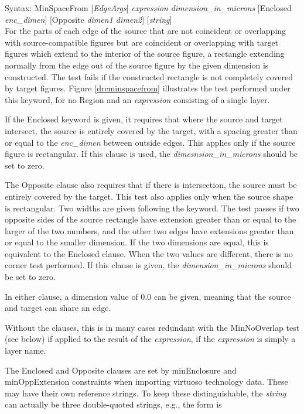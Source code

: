 \begin{description}
\item{Syntax: {\vt MinSpaceFrom} [{\it EdgeArgs\/}]
    {\it expression dimension\_in\_microns}
    [{\vt Enclosed} {\it enc\_dimen\/}]
    [{\vt Opposite} {\it dimen1 dimen2\/}] [{\it string\/}] }\\

For the parts of each edge of the source that are not coincident or
overlapping with source-compatible figures but are coincident or
overlapping with target figures which extend to the interior of the
source figure, a rectangle extending normally from the edge out of the
source figure by the given dimension is constructed.  The test fails
if the constructed rectangle is not completely covered by target
figures.  Figure \ref{drcminspacefrom} illustrates the test performed
under this keyword, for no {\et Region} and an {\it expression}
consisting of a single layer. 

If the {\vt Enclosed} keyword is given, it requires that where the
source and target intersect, the source is entirely covered by the
target, with a spacing greater than or equal to the {\it enc\_dimen}
between outside edges.  This applies only if the source figure is
rectangular.  If this clause is used, the {\it
dimesnsion\_in\_microns} should be set to zero.

The {\vt Opposite} clause also requires that if there is intersection,
the source must be entirely covered by the target.  This test also
applies only when the source shape is rectangular.  Two widths are
given following the keyword.  The test passes if two opposite sides of
the source rectangle have extension greater than or equal to the
larger of the two numbers, and the other two edges have extensions
greater than or equal to the smaller dimension.  If the two dimensions
are equal, this is equivalent to the {\vt Enclosed} clause.  When the
two values are different, there is no corner test performed.  If this
clause is given, the {\it dimension\_in\_microns} should be set to
zero.

In either clause, a dimension value of 0.0 can be given, meaning that
the source and target can share an edge.

Without the clauses, this is in many cases redundant with the {\et
MinNoOverlap} test (see below) if applied to the result of the {\it
expression}, if the {\it expression} is simply a layer name.

The {\vt Enclosed} and {\vt Opposite} clauses are set by {\vt
minEnclosure} and {\vt minOppExtension} constraints when importing
virtuoso technology data.  These may have their own reference strings. 
To keep these distinguishable, the {\it string} can actually be three
double-quoted strings, e.g., the form is


\end{description}
